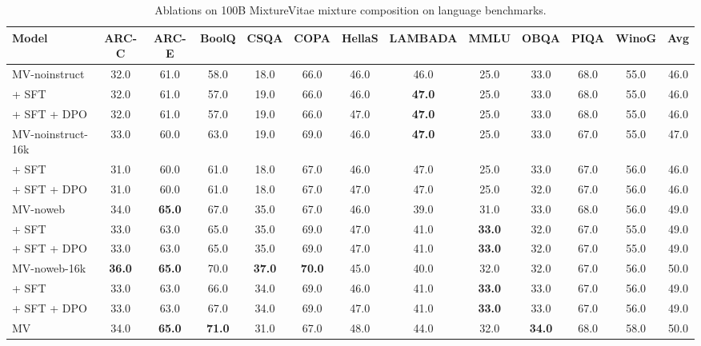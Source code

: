 \begin{table}[htbp]
\centering
\caption{Ablations on 100B MixtureVitae mixture composition on language benchmarks.}
\label{tab:lang_eval_table1}
\scriptsize
\begin{tabular}{lcccccccccccc}
\toprule
\textbf{Model} & \textbf{ARC-C} & \textbf{ARC-E} & \textbf{BoolQ} & \textbf{CSQA} & \textbf{COPA} & \textbf{HellaS} & \textbf{LAMBADA} & \textbf{MMLU} & \textbf{OBQA} & \textbf{PIQA} & \textbf{WinoG} & \textbf{Avg} \\
\midrule
MV-noinstruct & 32.0 & 61.0 & 58.0 & 18.0 & 66.0 & 46.0 & 46.0 & 25.0 & 33.0 & 68.0 & 55.0 & 46.0 \\
\quad + SFT & 32.0 & 61.0 & 57.0 & 19.0 & 66.0 & 46.0 & \textbf{47.0} & 25.0 & 33.0 & 68.0 & 55.0 & 46.0 \\
\quad + SFT + DPO & 32.0 & 61.0 & 57.0 & 19.0 & 66.0 & 47.0 & \textbf{47.0} & 25.0 & 33.0 & 68.0 & 55.0 & 46.0 \\
\midrule
\addlinespace[0.3em]
MV-noinstruct-16k & 33.0 & 60.0 & 63.0 & 19.0 & 69.0 & 46.0 & \textbf{47.0} & 25.0 & 33.0 & 67.0 & 55.0 & 47.0 \\
\quad + SFT & 31.0 & 60.0 & 61.0 & 18.0 & 67.0 & 46.0 & 47.0 & 25.0 & 33.0 & 67.0 & 56.0 & 46.0 \\
\quad + SFT + DPO & 31.0 & 60.0 & 61.0 & 18.0 & 67.0 & 47.0 & 47.0 & 25.0 & 32.0 & 67.0 & 56.0 & 46.0 \\
\midrule
\addlinespace[0.3em]
MV-noweb & 34.0 & \textbf{65.0} & 67.0 & 35.0 & 67.0 & 46.0 & 39.0 & 31.0 & 33.0 & 68.0 & 56.0 & 49.0 \\
\quad + SFT & 33.0 & 63.0 & 65.0 & 35.0 & 69.0 & 47.0 & 41.0 & \textbf{33.0} & 32.0 & 67.0 & 55.0 & 49.0 \\
\quad + SFT + DPO & 33.0 & 63.0 & 65.0 & 35.0 & 69.0 & 47.0 & 41.0 & \textbf{33.0} & 32.0 & 67.0 & 55.0 & 49.0 \\
\midrule
\addlinespace[0.3em]
MV-noweb-16k & \textbf{36.0} & \textbf{65.0} & 70.0 & \textbf{37.0} & \textbf{70.0} & 45.0 & 40.0 & 32.0 & 32.0 & 67.0 & 56.0 & 50.0 \\
\quad + SFT & 33.0 & 63.0 & 66.0 & 34.0 & 69.0 & 46.0 & 41.0 & \textbf{33.0} & 33.0 & 67.0 & 56.0 & 49.0 \\
\quad + SFT + DPO & 33.0 & 63.0 & 67.0 & 34.0 & 69.0 & 47.0 & 41.0 & \textbf{33.0} & 33.0 & 67.0 & 56.0 & 49.0 \\
\midrule
\addlinespace[0.3em]
MV & 34.0 & \textbf{65.0} & \textbf{71.0} & 31.0 & 67.0 & 48.0 & 44.0 & 32.0 & \textbf{34.0} & 68.0 & 58.0 & 50.0 \\

\end{tabular}
\end{table}
